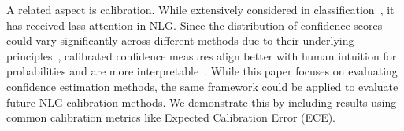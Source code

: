 
A related aspect is calibration. While extensively considered in classification~\cite{ICML2020_MixNMatch_KDEEval,kull2019beyond,ICML2021_MetaCal}, it has received lass attention in NLG.
Since the distribution of confidence scores could vary significantly across different methods due to their underlying principles~\cite{geng2023survey, da2024llm}, calibrated confidence measures align better with human intuition for probabilities and are more interpretable~\cite{ICML2017_Guo,cosmides1996humans}.
While this paper focuses on evaluating confidence estimation methods, the same framework could be applied to evaluate future NLG calibration methods.
We demonstrate this by including results using common calibration metrics like Expected Calibration Error (ECE).


